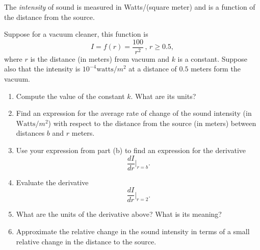\documentclass{ximera}
\begin{document}
\begin{question}  \label{Qdfdgt446666}
The \emph{intensity} of sound is measured in Watts/(square meter) and is a function of the distance from the source. 

Suppose for a vacuum cleaner, this function is
\[
          I = f(r) = \frac{100}{r^2} \, , \, r\geq 0.5 ,
\]
where $r$ is the distance (in meters) from vacuum and $k$ is a constant. Suppose also that the intensity is $10^{-4}\text{watts}/m^2$ at a distance of $0.5$ meters form the vacuum.

\begin{enumerate}

\item Compute the value of the constant $k$. What are its units?

\item Find an expression for the average rate of change of the sound intensity (in $\text{Watts}/m^2$) with respect to the distance from the source (in meters) between distances $b$ and $r$ meters.

\item Use your expression from part (b) to find an expression for the derivative 
\[
   \frac{dI}{dr} \Big|_{r=b}  .
\]

\item Evaluate the derivative
\[
       \frac{dI}{dr} \Big|_{r=2} .
\]

\item What are the units of the derivative above? What is its meaning?

\item Approximate the relative change in the sound intensity in terms of a small relative change in the distance to the source.
\end{enumerate}

\end{question}
\end{document}
